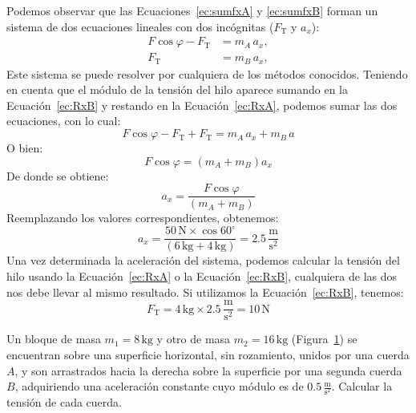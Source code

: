 \documentclass[addpoints]{exam}
\newcommand{\grado}[0]{^{\circ}}
\begin{document}
\begin{questions}
\begin{solution}
        Podemos observar que las Ecuaciones~\eqref{ec:sumfxA} y \eqref{ec:sumfxB} forman un sistema de dos ecuaciones lineales con dos incógnitas ($F_\text{T}$ y $a_x$):
        \begin{align}
            F \cos \varphi - F_\text{T} &= m_A \, a_x, \label{ec:RxA} \\
                            F_\text{T} &= m_B \, a_x, \label{ec:RxB}
        \end{align} Este sistema se puede resolver por cualquiera de los métodos conocidos. Teniendo en cuenta que el módulo de la tensión del hilo aparece sumando en la Ecuación~\eqref{ec:RxB} y restando en la Ecuación~\eqref{ec:RxA}, podemos sumar las dos ecuaciones, con lo cual: $$ F \cos \varphi - F_\text{T} + F_\text{T} = m_A \, a_x + m_B \, a$$ O bien: $$ F \cos \varphi = \left(m_A + m_B\right) a_x$$ De donde se obtiene: $$a_x = \frac{F \cos \varphi}{\left(m_A + m_B\right)}$$ Reemplazando los valores correspondientes, obtenemos: $$ a_x = \frac{50 \, \text{N} \times \cos 60\grado}{\left(6 \, \text{kg} + 4 \, \text{kg}\right)} = 2.5 \, \frac{\text{m}}{\text{s}^2}$$ Una vez determinada la aceleración del sistema, podemos calcular la tensión del hilo usando la Ecuación~\eqref{ec:RxA} o la Ecuación~\eqref{ec:RxB}, cualquiera de las dos nos debe llevar al mismo resultado. Si utilizamos la Ecuación~\eqref{ec:RxB}, tenemos: $$F_\text{T} = 4 \, \text{kg} \times 2.5 \, \frac{\text{m}}{\text{s}^2} = 10 \, \text{N}$$

    \end{solution}

    \question Un bloque de masa $m_1 = 8 \, \text{kg}$ y otro de masa $m_2 = 16 \, \text{kg}$ (Figura~\ref{fig:vinculados1}) se encuentran sobre una superficie horizontal, sin rozamiento, unidos por una cuerda $A$, y son arrastrados hacia la derecha sobre la superficie por una segunda cuerda $B$, adquiriendo una aceleración constante cuyo módulo es de $0.5 \, \frac{\text{m}}{\text{s}^2}$. Calcular la tensión de cada cuerda. \label{ej:vinculados2}

    \begin{figure}[h]
        \centering
        \caption{ }
        \label{fig:vinculados1}
    \end{figure}


\end{questions}
\end{document}
